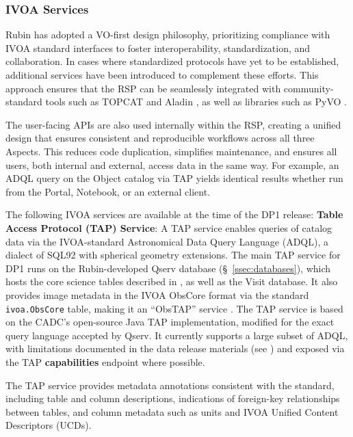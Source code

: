 \subsubsection{IVOA Services
\label{sssec:ivoa_services}}

Rubin has adopted a \gls{VO}-first design philosophy, prioritizing compliance with IVOA standard interfaces to foster interoperability, standardization, and collaboration.
In cases where standardized protocols have yet to be established, additional services have been introduced to complement these efforts. 
This approach ensures that the RSP can be seamlessly integrated with community-standard tools such as TOPCAT \citep{2011ascl.soft01010T} and Aladin \citep{2000A&AS..143...33B, 2014ASPC..485..277B, 2022ASPC..532....7B}, as well as libraries such as  PyVO \citep{2014ascl.soft02004G}.

The user-facing APIs are also used internally within the RSP, creating a unified design that ensures consistent and reproducible workflows across all three Aspects. 
This reduces code duplication, simplifies maintenance, and ensures all users, both internal and external, access data in the same way. 
For example, an ADQL query on the Object catalog via TAP yields identical results whether run from the Portal, Notebook, or an external client.

The following IVOA services are available at the time of the DP1 release:
\vspace{0.1cm}
\textbf{Table Access Protocol (TAP) Service}: A TAP service \citep{2019ivoa.spec.0927D} enables queries of catalog data via the IVOA-standard Astronomical Data Query Language (ADQL), a dialect of SQL92 with spherical geometry extensions.
The main TAP service for \gls{DP1} runs on the Rubin-developed \gls{Qserv} database (\S~\ref{ssec:databases}), which hosts the core science tables described in , as well as the Visit database. 
It also provides image metadata in the IVOA ObsCore format via the standard \texttt{ivoa.ObsCore} table, making it an ``ObsTAP'' service \citep[ObsTAP;][]{2017ivoa.spec.0509L}. 
The TAP service is based on the CADC's open-source Java TAP implementation, modified for the exact query language accepted by Qserv.
It currently supports a large subset of ADQL, with limitations documented in the data release materials (see ) and exposed via the TAP \textbf{capabilities} endpoint where possible. 

The TAP service provides metadata annotations consistent with the standard, including table and column descriptions, indications of foreign-key relationships between tables, and column metadata such as units and IVOA Unified Content Descriptors (UCDs).

